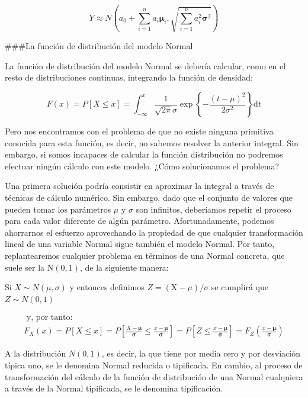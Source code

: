 \documentclass[
  a4paper,
  DIV=11,
  numbers=noendperiod]{scrreprt}
\begin{document}
\[
Y \approx N\left(a_{0}+\sum_{i=1}^{n} a_{i} \boldsymbol{\mu}_{i}, \sqrt{\sum_{i=1}^{n} a_{i}^{2} \boldsymbol{\sigma}^{2}}\right)
\]

\#\#\#La función de distribución del modelo Normal

La función de distribución del modelo Normal se debería calcular, como
en el resto de distribuciones continuas, integrando la función de
densidad:

\[
F(x)=P[X \leq x]=\int_{-\infty}^{x} \frac{1}{\sqrt{2 \pi} \sigma} \exp \left\{-\frac{(t-\mu)^{2}}{2 \sigma^{2}}\right\} \mathrm{dt}
\]

Pero nos encontramos con el problema de que no existe ninguna primitiva
conocida para esta función, es decir, no sabemos resolver la anterior
integral. Sin embargo, si somos incapaces de calcular la función
distribución no podremos efectuar ningún cálculo con este modelo. ¿Cómo
solucionamos el problema?

Una primera solución podría consistir en aproximar la integral a través
de técnicas de cálculo numérico. Sin embargo, dado que el conjunto de
valores que pueden tomar los parámetros \(\mu\) y \(\sigma\) son
infinitos, deberíamos repetir el proceso para cada valor diferente de
algún parámetro. Afortunadamente, podemos ahorrarnos el esfuerzo
aprovechando la propiedad de que cualquier transformación lineal de una
variable Normal sigue también el modelo Normal. Por tanto,
replantearemos cualquier problema en términos de una Normal concreta,
que suele ser la \(\mathrm{N}(0,1)\), de la siguiente manera:

Si \(X \sim N(\mu, \sigma)\) y entonces definimos
\(Z=(\mathrm{X}-\mu) / \sigma\) se cumplirá que \(Z \sim N(0,1)\)

\[
\begin{gathered}
\text { y, por tanto: } \\
F_{X}(x)=P[X \leq x]=P\left[\frac{X-\boldsymbol{\mu}}{\boldsymbol{\sigma}} \leq \frac{x-\boldsymbol{\mu}}{\boldsymbol{\sigma}}\right]=P\left[Z \leq \frac{x-\boldsymbol{\mu}}{\boldsymbol{\sigma}}\right]=F_{Z}\left(\frac{x-\boldsymbol{\mu}}{\boldsymbol{\sigma}}\right)
\end{gathered}
\]

A la distribución \(N(0,1)\), es decir, la que tiene por media cero y
por desviación típica uno, se le denomina Normal reducida o tipificada.
En cambio, al proceso de transformación del cálculo de la función de
distribución de una Normal cualquiera a través de la Normal tipificada,
se le denomina tipificación.
\end{document}
